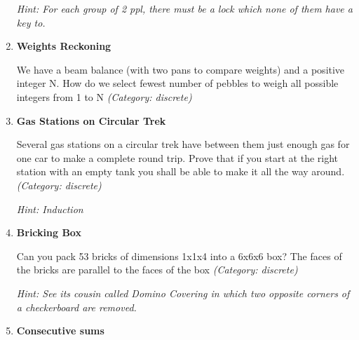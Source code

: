 \begin{enumerate}
\small\emph{Hint: For each group of 2 ppl, there must be a lock which none of them have a key to.}





\item \textbf{Weights Reckoning}

We have a beam balance (with two pans to compare weights) and a positive integer N. How do we select fewest number of pebbles to weigh all possible integers from 1 to N
\small\emph{(Category: discrete)}




\item \textbf{Gas Stations on Circular Trek}

Several gas stations on a circular trek have between them just enough gas for one car to make a complete round trip. Prove that if you start at the right station with an empty tank you shall be able to make it all the way around.
\small\emph{(Category: discrete)}

\small\emph{Hint: Induction}





\item \textbf{Bricking Box}

Can you pack 53 bricks of dimensions 1x1x4 into a 6x6x6 box? The faces of the bricks are parallel to the faces of the box
\small\emph{(Category: discrete)}

\small\emph{Hint: See its cousin called Domino Covering in which two opposite corners of a checkerboard are removed.}





\item \textbf{Consecutive sums}


\end{enumerate}
